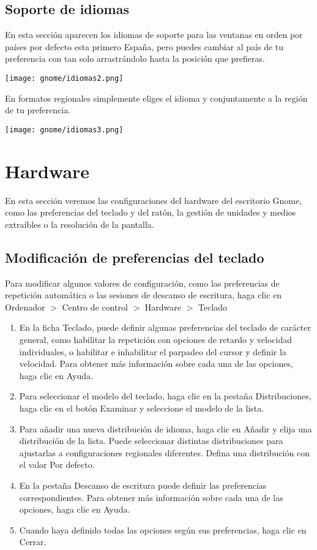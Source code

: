 \documentclass[12pt,letterpaper]{book}
\begin{document}
\subsection{Soporte de idiomas}
En esta sección aparecen los idiomas de soporte para las ventanas en orden por países por defecto esta primero España, pero puedes cambiar al país de tu preferencia con tan solo arrastrándolo hasta la posición que prefieras.
\begin{center}
\texttt{[image: gnome/idiomas2.png]} 
\end{center}
En formatos regionales simplemente eliges el idioma y conjuntamente a la región de tu preferencia.
\begin{center}
\texttt{[image: gnome/idiomas3.png]} 
\end{center}
\section{Hardware}
En esta sección veremos las configuraciones del hardware del escritorio Gnome, como las preferencias del teclado y del ratón, la gestión de unidades y medios extraíbles o la resolución de la pantalla.
\subsection{Modificación de preferencias del teclado}
Para modificar algunos valores de configuración, como las preferencias de repetición
automática o las sesiones de descanso de escritura, haga clic en Ordenador $>$ Centro
de control $>$ Hardware $>$ Teclado
\begin{enumerate}
\item En la ficha Teclado, puede definir algunas preferencias del teclado de carácter general, como habilitar la repetición con opciones de retardo y velocidad individuales, o habilitar e inhabilitar el parpadeo del cursor y definir la velocidad. Para obtener más información sobre cada una de las opciones, haga clic en Ayuda.
\item Para seleccionar el modelo del teclado, haga clic en la pestaña Distribuciones, haga clic en el botón Examinar y seleccione el modelo de la lista.
\item Para añadir una nueva distribución de idioma, haga clic en Añadir y elija una distribución de la lista. Puede seleccionar distintas distribuciones para ajustarlas a configuraciones regionales diferentes. Defina una distribución con el valor Por defecto.
\item En la pestaña Descanso de escritura puede definir las preferencias correspondientes. Para obtener más información sobre cada una de las opciones, haga clic
en Ayuda.
\item Cuando haya definido todas las opciones según sus preferencias, haga clic en Cerrar.
\end{enumerate}
\end{document}
